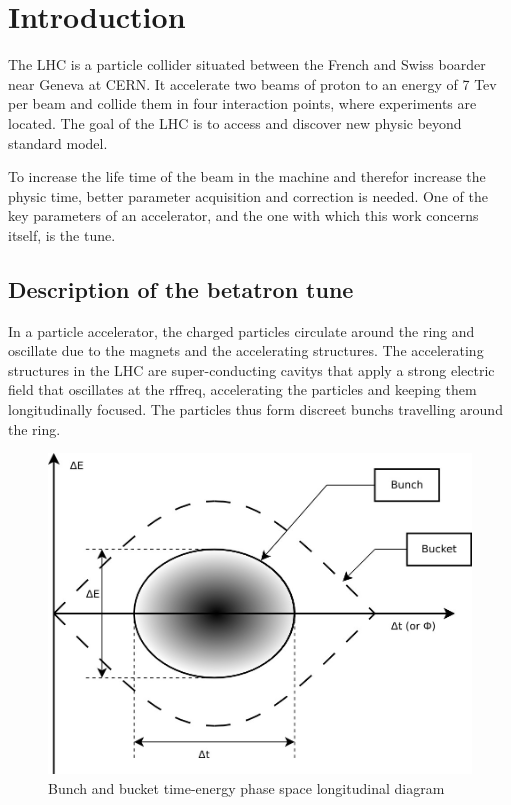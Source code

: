 %


\chapter{Introduction}

The \gls{LHC} is a particle collider situated between the French and Swiss boarder near Geneva at \gls{CERN}. It accelerate two beams of proton to an energy of 7 Tev per beam and collide them in four interaction points, where experiments are located. The goal of the \gls{LHC} is to access and discover new physic beyond standard model.

To increase the life time of the beam in the machine and therefor increase the physic time, better parameter acquisition and correction is needed. One of the key parameters of an accelerator, and the one with which this work concerns itself, is the \gls{tune}.

\section{Description of the betatron tune}

In a particle accelerator, the charged particles circulate around the ring and oscillate due to the magnets and the accelerating structures. The accelerating structures in the \gls{LHC} are super-conducting \glspl{cavity} that apply a strong electric field that oscillates at the \gls{rffreq}, accelerating the particles and keeping them longitudinally focused. The particles thus form discreet \glspl{bunch} travelling around the ring.

\begin{figure}[H]
\centering
\caption{Bunch and bucket time-energy phase space longitudinal diagram}
\includegraphics[scale=0.3]{phase_space.jpeg}
\end{figure}

